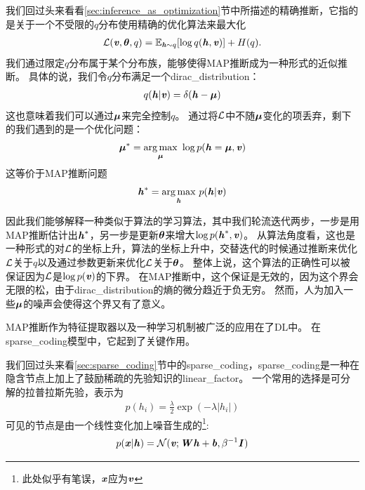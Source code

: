 我们回过头来看看\ref{sec:inference_as_optimization}节中所描述的精确推断，它指的是关于一个不受限的$q$分布使用精确的优化算法来最大化
\begin{align}
\mathcal{L}(\boldsymbol{\mathit{v}},{\boldsymbol{\theta}},q)
 = \mathbb{E}_{\boldsymbol{\mathit{h}}\sim q}[\log q(\boldsymbol{\mathit{h}} , \boldsymbol{\mathit{v}})] + H(q).
\end{align}
我们通过限定$q$分布属于某个分布族，能够使得\gls{MAP}推断成为一种形式的近似推断。
具体的说，我们令$q$分布满足一个\gls{dirac_distribution}：
\begin{align}
q(\boldsymbol{\mathit{h}}\vert\boldsymbol{\mathit{v}}) = \delta(\boldsymbol{\mathit{h}} - {\boldsymbol{\mu}})
\end{align}
这也意味着我们可以通过$\boldsymbol{\mu}$来完全控制$q$。
通过将$\mathcal{L}$中不随$\boldsymbol{\mu}$变化的项丢弃，剩下的我们遇到的是一个优化问题：
\begin{align}
\boldsymbol{\mu}^*  =  \underset{\boldsymbol{\mu}}{\arg\max}\ \log p(\boldsymbol{\mathit{h}} = \boldsymbol{\mu},\boldsymbol{\mathit{v}})
\end{align}
这等价于\gls{MAP}推断问题
\begin{align}
\boldsymbol{\mathit{h}}^* = \underset{\boldsymbol{\mathit{h}}}{\arg\max}\  p(\boldsymbol{\mathit{h}}\vert\boldsymbol{\mathit{v}})
\end{align}




因此我们能够解释一种类似于算法的学习算法，其中我们轮流迭代两步，一步是用\gls{MAP}推断估计出$\boldsymbol{\mathit{h}}^*$，另一步是更新$\boldsymbol{\theta}$来增大$\log p(\boldsymbol{\mathit{h}}^*,\boldsymbol{\mathit{v}})$。
从算法角度看，这也是一种形式的对$\mathcal{L}$的坐标上升，算法的坐标上升中，交替迭代的时候通过推断来优化$\mathcal{L}$关于$q$以及通过参数更新来优化$\mathcal{L}$关于$\boldsymbol{\theta}$。
整体上说，这个算法的正确性可以被保证因为$\mathcal{L}$是$\log p(\boldsymbol{\mathit{v}})$的下界。
在\gls{MAP}推断中，这个保证是无效的，因为这个界会无限的松，由于\gls{dirac_distribution}的熵的微分趋近于负无穷。
然而，人为加入一些$\boldsymbol{\mu}$的噪声会使得这个界又有了意义。



\gls{MAP}推断作为特征提取器以及一种学习机制被广泛的应用在了\gls{DL}中。
在\gls{sparse_coding}模型中，它起到了关键作用。


我们回过头来看\ref{sec:sparse_coding}节中的\gls{sparse_coding}，\gls{sparse_coding}是一种在隐含节点上加上了鼓励稀疏的先验知识的\gls{linear_factor}。
一个常用的选择是可分解的拉普拉斯先验，表示为
\begin{align}
	p(h_i) = \frac{\lambda}{2} \exp(-\lambda\vert h_i\vert)
\end{align}
可见的节点是由一个线性变化加上噪音生成的\footnote{此处似乎有笔误，$\boldsymbol{\mathit{x}}$应为$\boldsymbol{\mathit{v}}$}:
\begin{align}
	p(\boldsymbol{\mathit{x}}\vert\boldsymbol{\mathit{h}}) = \mathcal{N}(\boldsymbol{\mathit{v}};{\boldsymbol{\mathit{W}}}\boldsymbol{\mathit{h}} + \boldsymbol{\mathit{b}},\beta^{-1}{\boldsymbol{\mathit{I}}})
\end{align}




